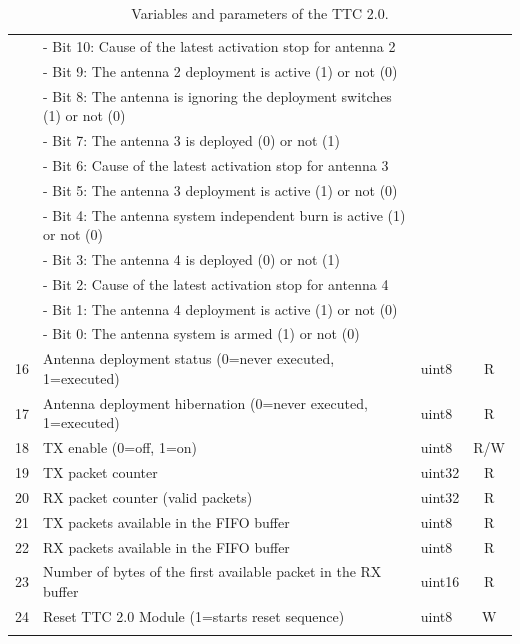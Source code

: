 \begin{longtable}[c]{cL{0.72\textwidth}lc}
        & - Bit 10: Cause of the latest activation stop for antenna 2       &        &   \\
        & - Bit 9: The antenna 2 deployment is active (1) or not (0)        &        &   \\
        & - Bit 8: The antenna is ignoring the deployment switches (1) or not (0) &  &   \\
        & - Bit 7: The antenna 3 is deployed (0) or not (1)                 &        &   \\
        & - Bit 6: Cause of the latest activation stop for antenna 3        &        &   \\
        & - Bit 5: The antenna 3 deployment is active (1) or not (0)        &        &   \\
        & - Bit 4: The antenna system independent burn is active (1) or not (0) &    &   \\
        & - Bit 3: The antenna 4 is deployed (0) or not (1)                 &        &   \\
        & - Bit 2: Cause of the latest activation stop for antenna 4        &        &   \\
        & - Bit 1: The antenna 4 deployment is active (1) or not (0)        &        &   \\
        & - Bit 0: The antenna system is armed (1) or not (0)               &        &   \\
    16  & Antenna deployment status (0=never executed, 1=executed)          & uint8  & R \\
    17  & Antenna deployment hibernation (0=never executed, 1=executed)     & uint8  & R \\
    18  & TX enable (0=off, 1=on)                                           & uint8  & R/W \\
    19  & TX packet counter                                                 & uint32 & R \\
    20  & RX packet counter (valid packets)                                 & uint32 & R \\
    21  & TX packets available in the FIFO buffer                           & uint8  & R \\
    22  & RX packets available in the FIFO buffer                           & uint8  & R \\
    23  & Number of bytes of the first available packet in the RX buffer    & uint16 & R \\
    24  & Reset TTC 2.0 Module (1=starts reset sequence)                    & uint8  & W \\
    \bottomrule[1.5pt]
    \caption{Variables and parameters of the TTC 2.0.}
    \label{tab:ttc2-variables}
\end{longtable}


